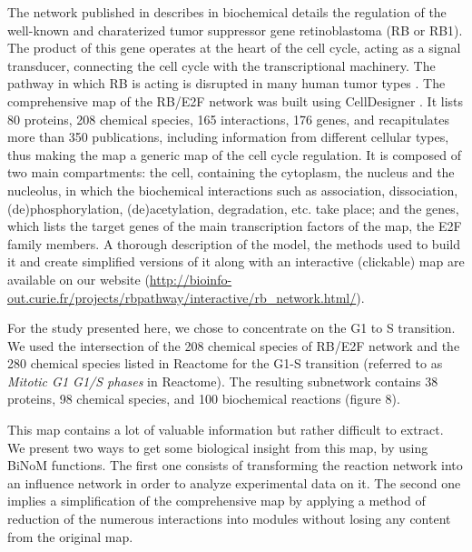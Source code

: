 \documentclass[10pt]{bmc_article}
\newenvironment{bmcformat}{\baselineskip20pt\sloppy\setboolean{publ}{false}}{\baselineskip20pt\sloppy}
\begin{document}
\begin{bmcformat}
The network published in \cite{calzone2008comprehensive} describes in
biochemical details the regulation of the well-known and charaterized tumor
suppressor gene retinoblastoma (RB or RB1). The product of this gene operates at
the heart of the cell cycle, acting as a signal transducer, connecting the
cell cycle with the transcriptional machinery. The pathway in which RB is
acting is disrupted in many human tumor types \cite{weinberg1995retinoblastoma}.
The comprehensive map of the RB/E2F network was built using CellDesigner
\cite{funahashi2003celldesigner}. It lists 80 proteins, 208 chemical species, 165
interactions, 176 genes, and recapitulates more than 350 publications, including
information from different cellular types, thus making the map a generic map of
the cell cycle regulation. It is composed of two main compartments: the cell,
containing the cytoplasm, the nucleus and the nucleolus, in which the
biochemical interactions such as association, dissociation, (de)phosphorylation,
(de)acetylation, degradation, etc. take place; and the genes, which lists the
target genes of the main transcription factors of the map, the E2F family
members.
A thorough description of the model, the methods used to build it and create
simplified versions of it along with an interactive (clickable) map are
available on our website
(\url{http://bioinfo-out.curie.fr/projects/rbpathway/interactive/rb_network.html/}).

For the study presented here, we chose to concentrate on the G1 to S transition. We
used the intersection of the 208 chemical species
of RB/E2F network and the 280 chemical species listed in Reactome \cite{joshi2005reactome} for the G1-S transition
(referred to as \emph{Mitotic G1 G1/S phases} in Reactome). The resulting
subnetwork contains 38 proteins, 98 chemical species, and 100 biochemical
reactions (figure 8).


This map contains a lot of valuable information but rather difficult to extract. We present two
ways to get some biological insight from this map, by using BiNoM functions. The first one consists of
transforming the reaction network into an influence network in order to analyze
experimental data on it. The second one implies a simplification of the comprehensive map by
applying a method of reduction of the numerous interactions into modules without
losing any content from the original map.


\end{bmcformat}
\end{document}
